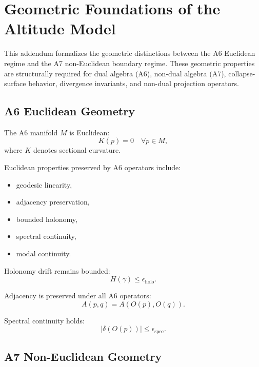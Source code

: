 
\section{Geometric Foundations of the Altitude Model}

This addendum formalizes the geometric distinctions between the A6 Euclidean
regime and the A7 non-Euclidean boundary regime. These geometric properties are
structurally required for dual algebra (A6), non-dual algebra (A7), collapse-
surface behavior, divergence invariants, and non-dual projection operators.

\subsection{A6 Euclidean Geometry}

The A6 manifold $M$ is Euclidean:
\[
K(p) = 0 \quad \forall p \in M,
\]
where $K$ denotes sectional curvature.

Euclidean properties preserved by A6 operators include:
\begin{itemize}
  \item geodesic linearity,
  \item adjacency preservation,
  \item bounded holonomy,
  \item spectral continuity,
  \item modal continuity.
\end{itemize}

Holonomy drift remains bounded:
\[
H(\gamma) \le \epsilon_{\mathrm{holo}}.
\]

Adjacency is preserved under all A6 operators:
\[
A(p,q) = A(O(p), O(q)).
\]

Spectral continuity holds:
\[
|\delta(O(p))| \le \epsilon_{\mathrm{spec}}.
\]

\subsection{A7 Non-Euclidean Geometry}

